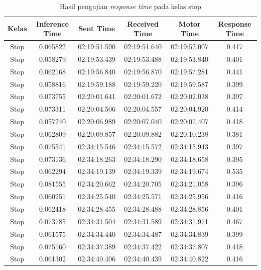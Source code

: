 \begin{longtable}{|c|c|c|c|c|c|}
  \caption{Hasil pengujian \emph{response time} pada kelas stop} 
  \label{tb:delaystop} \\
  \hline
  \rowcolor[HTML]{C0C0C0} 
      \textbf{Kelas} & \textbf{Inference Time} & \textbf{Sent Time} & \textbf{Received Time} & \textbf{Motor Time} & \textbf{Response Time} \\ \hline
      Stop & 0.065822 & 02:19:51.590 & 02:19:51.640 & 02:19:52.007 & 0.417 \\ \hline
      Stop & 0.058279 & 02:19:53.439 & 02:19:53.488 & 02:19:53.840 & 0.401 \\ \hline
      Stop & 0.062168 & 02:19:56.840 & 02:19:56.870 & 02:19:57.281 & 0.441 \\ \hline
      Stop & 0.058816 & 02:19:59.188 & 02:19:59.220 & 02:19:59.587 & 0.399 \\ \hline
      Stop & 0.073755 & 02:20:01.641 & 02:20:01.672 & 02:20:02.038 & 0.397 \\ \hline
      Stop & 0.073311 & 02:20:04.506 & 02:20:04.557 & 02:20:04.920 & 0.414 \\ \hline
      Stop & 0.057240 & 02:20:06.989 & 02:20:07.040  & 02:20:07.407 & 0.418 \\ \hline
      Stop & 0.062809 & 02:20:09.857 & 02:20:09.882 & 02:20:10.238 & 0.381 \\ \hline
      Stop & 0.075541 & 02:34:15.546 & 02:34:15.572 & 02:34:15.943 & 0.397 \\ \hline
      Stop & 0.073136 & 02:34:18.263 & 02:34:18.290 & 02:34:18.658 & 0.395 \\ \hline
      Stop & 0.062294 & 02:34:19.139 & 02:34:19.339 & 02:34:19.674  & 0.535 \\ \hline
      Stop & 0.081555 & 02:34:20.662 & 02:34:20.705 & 02:34:21.058 & 0.396 \\ \hline
      Stop & 0.060251 & 02:34:25.540 & 02:34:25.571 & 02:34:25.956 & 0.416 \\ \hline
      Stop & 0.062418 & 02:34:28.455 & 02:34:28.488  & 02:34:28.856 & 0.401 \\ \hline
      Stop & 0.073785 & 02:34:31.504 & 02:34:31.589 & 02:34:31.971 & 0.467 \\ \hline
      Stop & 0.061575 & 02:34:34.440 & 02:34:34.487 & 02:34:34.839 & 0.399 \\ \hline
      Stop & 0.075160 & 02:34:37.389 & 02:34:37.422 & 02:34:37.807 & 0.418 \\ \hline
      Stop & 0.061302 & 02:34:40.406 & 02:34:40.439 & 02:34:40.822 & 0.416 \\ \hline

\end{longtable}
